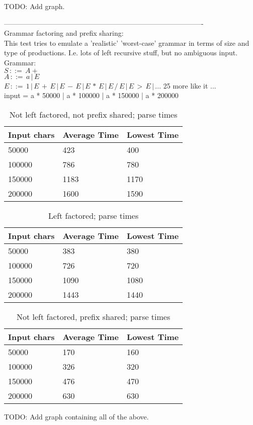 \documentclass[a4paper,10pt]{article}
\begin{document}
TODO: Add graph.

-------------------------------------------------------------------------------------\\

Grammar factoring and prefix sharing:\\
This test tries to emulate a 'realistic' 'worst-case' grammar in terms of size and type of productions. I.e. lots of left recursive stuff, but no ambiguous input.\\

Grammar:\\
$S\,::=\,A+$\\
$A\,::=\,a\,|\,E$\\
$E\,::=\,1\,|\,E\,+\,E\,|\,E\,-\,E\,|\,E\,*\,E\,|\,E\,/\,E\,|\,E\,>\,E\,|\,...$ 25 more like it ...\\
input = a * 50000 | a * 100000 | a * 150000 | a * 200000\\

\begin{table}
\centering
\begin{tabular}{ | p{5em} | p{7em} | p{6em} | }
  \hline
  Input chars & Average Time & Lowest Time \\
  \hline
  50000 & 423 & 400 \\
  100000 & 786 & 780 \\
  150000 & 1183 & 1170 \\
  200000 & 1600 & 1590 \\
  \hline
\end{tabular}
\caption{Not left factored, not prefix shared; parse times}
\end{table}

\begin{table}
\centering
\begin{tabular}{ | p{5em} | p{7em} | p{6em} | }
  \hline
  Input chars & Average Time & Lowest Time \\
  \hline
  50000 & 383 & 380 \\
  100000 & 726 & 720 \\
  150000 & 1090 & 1080 \\
  200000 & 1443 & 1440 \\
  \hline
\end{tabular}
\caption{Left factored; parse times}
\end{table}

\begin{table}
\centering
\begin{tabular}{ | p{5em} | p{7em} | p{6em} | }
  \hline
  Input chars & Average Time & Lowest Time \\
  \hline
  50000 & 170 & 160 \\
  100000 & 326 & 320 \\
  150000 & 476 & 470 \\
  200000 & 630 & 630 \\
  \hline
\end{tabular}
\caption{Not left factored, prefix shared; parse times}
\end{table}

TODO: Add graph containing all of the above.\\
\end{document}
